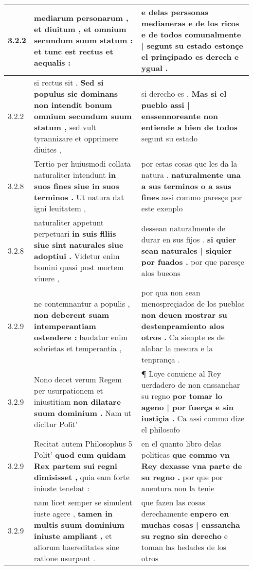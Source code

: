 \begin{tabular}{|p{1cm}|p{6.5cm}|p{6.5cm}|}
3.2.2 & mediarum personarum , et diuitum , \textbf{ et omnium secundum suum statum : } et tunc est rectus et aequalis : & e delas perssonas medianeras e de los ricos \textbf{ e de todos comunalmente | segunt su estado } estonçe el prinçipado es derech e ygual . \\\hline
3.2.2 & si rectus sit . \textbf{ Sed si populus sic dominans non intendit bonum omnium secundum suum statum , } sed vult tyrannizare et opprimere diuites , & si derecho es . \textbf{ Mas si el pueblo assi | enssennoreante non entiende a bien de todos } segunt su estado \\\hline
3.2.8 & Tertio per huiusmodi collata naturaliter intendunt \textbf{ in suos fines siue in suos terminos . } Ut natura dat igni leuitatem , & por estas cosas que les da la natura . \textbf{ naturalmente una a sus terminos o a ssus fines } assi commo paresçe por este exenplo \\\hline
3.2.8 & naturaliter appetunt perpetuari \textbf{ in suis filiis siue sint naturales siue adoptiui . } Videtur enim homini quasi post mortem viuere , & dessean naturalmente de durar en sus fijos . \textbf{ si quier sean naturales | siquier por fuados . } por que paresçe alos bueons \\\hline
3.2.9 & ne contemnantur a populis , \textbf{ non deberent suam intemperantiam ostendere : } laudatur enim sobrietas et temperantia , & por qua non sean menospreçiados de los pueblos \textbf{ non deuen mostrar su destenpramiento alos otros . } Ca sienpte es de alabar la mesura e la tenprança . \\\hline
3.2.9 & Nono decet verum Regem per usurpationem et iniustitiam \textbf{ non dilatare suum dominium . } Nam ut dicitur Polit’ & ¶ Loye conuiene al Rey uerdadero de non enssanchar su regno \textbf{ por tomar lo ageno | por fuerça e sin iustiçia . } Ca assi commo dize el philosofo \\\hline
3.2.9 & Recitat autem Philosophus 5 Polit’ \textbf{ quod cum quidam Rex partem sui regni dimisisset , } quia eam forte iniuste tenebat : & en el quanto libro delas politicas \textbf{ que commo vn Rey dexasse vna parte de su regno . } por que por auentura non la tenie \\\hline
3.2.9 & nam licet semper se simulent iuste agere , \textbf{ tamen in multis suum dominium iniuste ampliant , } et aliorum haereditates sine ratione usurpant . & que fazen las cosas derechamente \textbf{ enpero en muchas cosas | enssancha su regno sin derecho } e toman las hedades de los otros \\\hline

\end{tabular}
